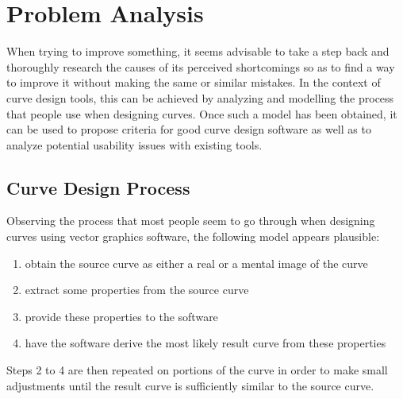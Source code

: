 \documentclass[a4paper]{article}
\begin{document}

	\section{Problem Analysis}
	\label{section:problem_analysis}

		When trying to improve something, it seems advisable to take a step back and thoroughly research the causes of its perceived shortcomings so as to find a way to improve it without making the same or similar mistakes. In the context of curve design tools, this can be achieved by analyzing and modelling the process that people use when designing curves. Once such a model has been obtained, it can be used to propose criteria for good curve design software as well as to analyze potential usability issues with existing tools.

		\subsection{Curve Design Process}
		\label{section:curve_design_process}

			Observing the process that most people seem to go through when designing curves using vector graphics software, the following model appears plausible:
			\begin{enumerate}
				\item obtain the source curve as either a real or a mental image of the curve
				\item extract some properties from the source curve
				\item provide these properties to the software
				\item have the software derive the most likely result curve from these properties
			\end{enumerate}

			Steps 2 to 4 are then repeated on portions of the curve in order to make small adjustments until the result curve is sufficiently similar to the source curve.
\end{document}
